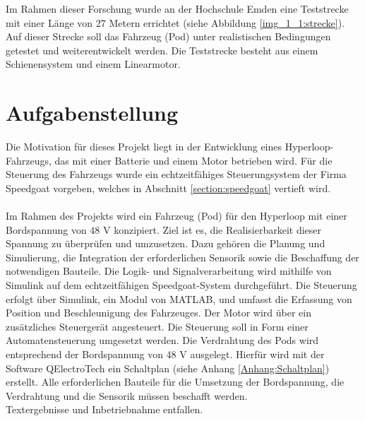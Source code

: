 
Im Rahmen dieser Forschung wurde an der Hochschule Emden eine Teststrecke mit einer Länge von 27 Metern errichtet (siehe Abbildung \ref{img_1_1:strecke}). Auf dieser Strecke soll das Fahrzeug (Pod) unter realistischen Bedingungen getestet und weiterentwickelt werden.
Die Teststrecke besteht aus einem Schienensystem und einem Linearmotor.

\newpage




\section{Aufgabenstellung}
\label{section:Aufgabenstellung}



Die Motivation für dieses Projekt liegt in der Entwicklung eines Hyperloop-Fahrzeugs, das mit einer Batterie und einem Motor betrieben wird. Für die Steuerung des Fahrzeugs wurde ein echtzeitfähiges Steuerungsystem der Firma Speedgoat vorgeben, welches in Abschnitt \ref{section:speedgoat} vertieft wird.\\ \ \\

Im Rahmen des Projekts wird ein Fahrzeug (Pod) für den Hyperloop mit einer Bordspannung von 48 V konzipiert. Ziel ist es, die Realisierbarkeit dieser Spannung zu überprüfen und umzusetzen. Dazu gehören die Planung und Simulierung, die Integration der erforderlichen Sensorik sowie die Beschaffung der notwendigen Bauteile. Die Logik- und Signalverarbeitung wird mithilfe von Simulink auf dem echtzeitfähigen Speedgoat-System durchgeführt.
Die Steuerung erfolgt über Simulink, ein Modul von MATLAB, und umfasst die Erfassung von Position und Beschleunigung des Fahrzeuges. Der Motor wird über ein zusätzliches Steuergerät angesteuert. Die Steuerung soll in Form einer Automatensteuerung umgesetzt werden.
Die Verdrahtung des Pods wird entsprechend der Bordspannung von 48 V ausgelegt. Hierfür wird mit der Software QElectroTech ein Schaltplan (siehe Anhang \ref{Anhang:Schaltplan}) erstellt.
Alle erforderlichen Bauteile für die Umsetzung der Bordspannung, die Verdrahtung und die Sensorik müssen beschafft werden.\\
Textergebnisse und Inbetriebnahme entfallen.


